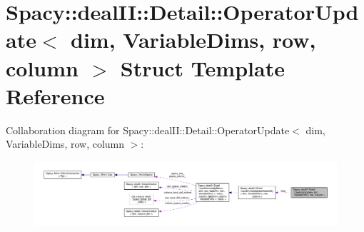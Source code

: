 \hypertarget{structSpacy_1_1dealII_1_1Detail_1_1OperatorUpdate}{\section{Spacy\-:\-:deal\-I\-I\-:\-:Detail\-:\-:Operator\-Update$<$ dim, Variable\-Dims, row, column $>$ Struct Template Reference}
\label{structSpacy_1_1dealII_1_1Detail_1_1OperatorUpdate}
}


Collaboration diagram for Spacy\-:\-:deal\-I\-I\-:\-:Detail\-:\-:Operator\-Update$<$ dim, Variable\-Dims, row, column $>$\-:
\nopagebreak
\begin{figure}[H]
\begin{center}
\leavevmode
\includegraphics[width=350pt]{structSpacy_1_1dealII_1_1Detail_1_1OperatorUpdate__coll__graph}
\end{center}
\end{figure}
